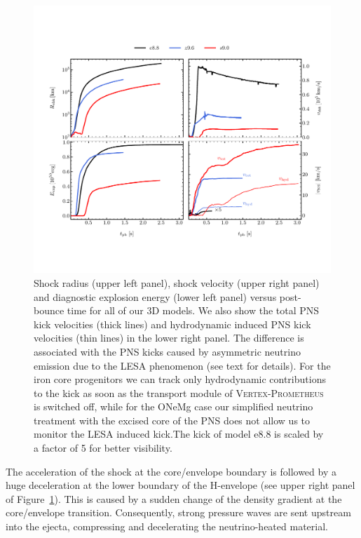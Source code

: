 \documentclass[fleqn,usenatbib]{mnras}
\newcommand{\vertexprom}{\textsc{Vertex-Prometheus}\xspace}
\newcommand{\onemg}{\ensuremath{\mathrm{e8.8}}\xspace}
\newcommand{\GEO}[1]{{\color{red}#1}}
\begin{document}
\begin{figure}
 \centering
 \includegraphics[width=\textwidth,trim=0.1cm 2.1cm 0cm 2.3cm,clip]{./pic/eexp_shk_kick_all_paper.pdf}
 \caption{Shock radius (upper left panel), shock velocity (upper right panel) and diagnostic explosion energy (lower left panel) versus post-bounce time for all of our 3D models. We also show the total PNS kick velocities (thick lines) and hydrodynamic induced PNS kick velocities (thin lines) in the lower right panel. \GEO{The difference is associated with the PNS kicks caused by asymmetric neutrino emission due to the LESA phenomenon (see text for details). For the iron core progenitors we can track only hydrodynamic contributions to the kick as soon as the transport module of \vertexprom is switched off, while for the ONeMg case our simplified neutrino treatment with the excised core of the PNS does not allow us to monitor the LESA induced kick.}The kick of model \onemg is scaled by a factor of 5 for better visibility. }
\label{fig:eexp all}
\end{figure}

The acceleration of the shock at the core/envelope boundary is followed by a huge deceleration at the lower boundary of the H-envelope (see upper right panel of Figure~\ref{fig:eexp all}). This is caused by a sudden change of the density gradient at the core/envelope transition.  
Consequently, strong pressure waves are sent upstream into the ejecta, compressing and decelerating the neutrino-heated material.
\end{document}
